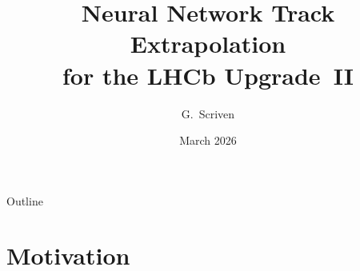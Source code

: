 \documentclass[aspectratio=169, 11pt]{beamer}
\title[NN Track Extrapolation]{%
  \textbf{Neural Network Track Extrapolation}\\[4pt]
  \large for the LHCb Upgrade~II}
\author{G.~Scriven}
\institute{LHCb\quad$\cdot$\quad Nikhef}
\date{March 2026}
\begin{document}
\begin{frame}[plain]
  \titlepage
\end{frame}

\begin{frame}{Outline}
  \tableofcontents
\end{frame}


\section{Motivation}
\end{document}
